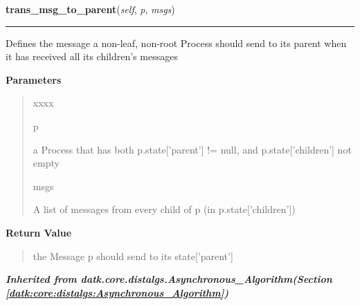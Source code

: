     \label{datk:core:algs:AsynchConvergecast:trans_msg_to_parent}

    \vspace{0.5ex}

\hspace{.8\funcindent}\begin{boxedminipage}{\funcwidth}

    \raggedright \textbf{trans\_msg\_to\_parent}(\textit{self}, \textit{p}, \textit{msgs})

    \vspace{-1.5ex}

    \rule{\textwidth}{0.5\fboxrule}
\setlength{\parskip}{2ex}
    Defines the message a non-leaf, non-root Process should send to its 
    parent when it has received all its children's messages

\setlength{\parskip}{1ex}
      \textbf{Parameters}
      \vspace{-1ex}

      \begin{quote}
        \begin{Ventry}{xxxx}

          \item[p]

          a Process that has both p.state['parent'] != null, and 
          p.state['children'] not empty

          \item[msgs]

          A list of messages from every child of p (in p.state['children'])

        \end{Ventry}

      \end{quote}

      \textbf{Return Value}
    \vspace{-1ex}

      \begin{quote}
      the Message p should send to its state['parent']

      \end{quote}

    \end{boxedminipage}


\large{\textbf{\textit{Inherited from datk.core.distalgs.Asynchronous\_Algorithm\textit{(Section \ref{datk:core:distalgs:Asynchronous_Algorithm})}}}}

